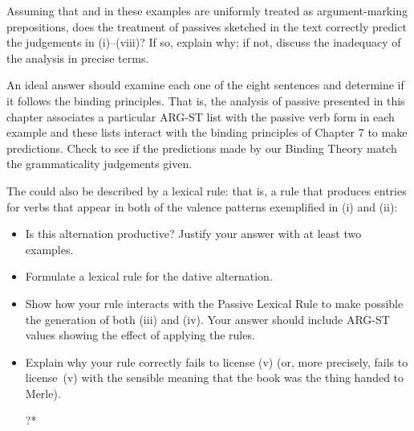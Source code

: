 \documentclass[a4paper,landscape,headrule,footrule]{foils}
\begin{document}
\noindent
Assuming that  and  in these examples are uniformly
treated as argument-marking prepositions, 
does the treatment of passives sketched in the text
correctly predict the judgements in (i)--(viii)?
If so, explain why; if not, discuss the inadequacy of the analysis in
precise terms. 

An ideal answer should examine each one of the eight sentences and determine
if it follows the binding principles. That is, the analysis of passive
presented in this chapter associates a particular ARG-ST list with the passive
verb form in each example and these lists interact with the binding principles
of Chapter 7 to make predictions. Check to see if the predictions made by our
Binding Theory match the grammaticality judgements given. 


The  could also be described by a lexical
rule: that is, a rule that produces entries for verbs that appear in
both of the valence patterns exemplified in (i) and (ii):

\begin{exe}
 
 
\end{exe}

\begin{itemize}
\item[A.] Is this alternation productive? Justify your answer with at
  least two examples.
\item[B.] Formulate a  lexical rule for the dative
  alternation. 
\newpage
\item[C.] Show how your rule interacts with the Passive Lexical Rule
  to make possible the generation of both (iii) and (iv). Your answer
  should include ARG-ST values showing the effect of applying the
  rules. 
\begin{exe}
 
  
\end{exe}
\item[D.] Explain why your rule correctly fails to license (v) (or,
more precisely, fails to license~(v) with the sensible meaning
that the book was the thing handed to Merle).
\begin{exe}
 ?*
\end{exe}
\end{itemize}
\end{document}
